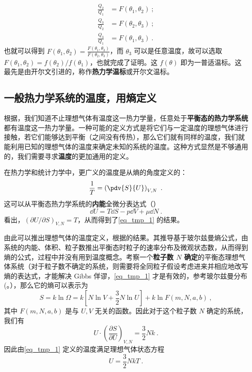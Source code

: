 \begin{equation}
\begin{aligned}
\frac{Q_2}{Q_1} &= F(\theta_1, \theta_2)~;\\
\frac{Q_3}{Q_2} &= F(\theta_2, \theta_3)~;\\
\frac{Q_3}{Q_1} &= F(\theta_1, \theta_3)~.
\end{aligned}
\end{equation}
也就可以得到 $F(\theta_1, \theta_2) = \frac{F(\theta_1, \theta_3)}{F(\theta_2, \theta_3)}$，而 $\theta_3$ 可以是任意温度，故可以选取 $F(\theta_1, \theta_2) = f(\theta_2)/f(\theta_1)$，也就完成了证明。这 $f(\theta)$ 即为一普适温标。这最先是由开尔文引进的，称作\textbf{热力学温标}或开尔文温标。

\subsection{一般热力学系统的温度，用熵定义}
根据，我们知道不止理想气体有温度这一热力学量，任意处于\textbf{平衡态的热力学系统}都有温度这一热力学量。一种可能的定义方式是将它们与一定温度的理想气体进行接触，若它们能够达到平衡（之间没有传热），那么它们就有同样的温度，我们就能利用已知的理想气体的温度来确定未知的系统的温度。这种方式显然是不够通用的，我们需要寻求\textbf{温度}的更加通用的定义。

在热力学和统计力学中，更广义的温度是从熵的角度定义的：
\begin{equation}\label{eq_tmp_1}
\frac{1}{T} = \left(\pdv{S}{U}\right)_{V,N} ~.
\end{equation}
这可以从平衡态热力学系统的\textbf{内能}全微分表达式（）
\begin{equation}
\dd U=T\dd S-p\dd V+\mu \dd N~.
\end{equation}
看出，$(\partial U/\partial S)_{V,N}=T$，从而得到了\autoref{eq_tmp_1} 的结果。

由此可以推出理想气体的温度定义，根据的结果。其推导基于玻尔兹曼熵公式，由系统的内能、体积、粒子数推出平衡态时粒子的速率分布及微观状态数，从而得到熵的公式，过程中并没有用到温度概念。考察一个\textbf{粒子数 $N$ 确定}的平衡态理想气体系统（对于粒子数不确定的系统，则需要将全同粒子假设考虑进来并相应地改写熵的表达式，才能解决 Gibbs 佯谬，\autoref{eq_tmp_1} 才是有效的，参考玻尔兹曼分布(。），那么它的熵可以表示为
\begin{equation}
S=k\ln \Omega =k\left[ N\ln V+\frac{3}{2}N\ln U \right] +k\ln F\left( m,N,a,b \right) ~,
\end{equation}
其中 $F(m,N,a,b)$ 是与 $U,V$ 无关的函数。因此对于这个粒子数 $N$ 确定的系统，我们有
\begin{equation}
U\cdot \left(\frac{\partial S}{\partial U}\right)_{V,N}=\frac{3}{2}Nk~.
\end{equation}
因此由\autoref{eq_tmp_1} 定义的温度满足理想气体状态方程
\begin{equation}
U=\frac{3}{2}NkT~.
\end{equation}
